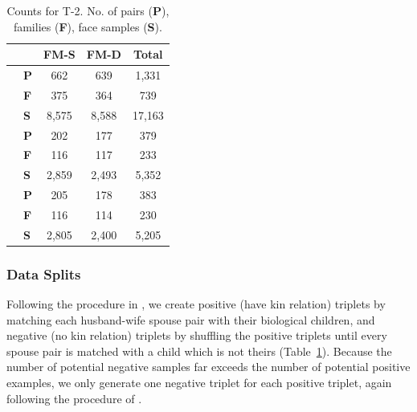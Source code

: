 \documentclass[letterpaper, 10 pt, conference]{ieeeconf}  %
\begin{document}
\begin{table}[b]
    \centering
    
    \caption{Counts for T-2. No. of pairs (\textbf{P}), families (\textbf{F}), face samples (\textbf{S}).}
    \small
    \begin{tabular}{p{.1in}m{.1in}ccc}
    & &FM-S &FM-D &Total\\\hline
     \parbox[t]{2mm}{
     }&\textbf{P} & 662  & 639 &1,331 \\
     &\textbf{F}  &375 & 364 & 739\\
     &\textbf{S} &8,575& 8,588 &  17,163\\\hline
    
    \parbox[t]{2mm}{
    } &\textbf{P}  & 202 & 177 & 379 \\
     &\textbf{F}  &116  & 117& 233\\
     &\textbf{S}  & 2,859 & 2,493 & 5,352 \\\hline
    \parbox[t]{2mm}{
    } &\textbf{P}  &  205& 178 & 383  \\
     &\textbf{F}  & 116  & 114  & 230 \\
     &\textbf{S}  & 2,805 &2,400 &5,205\\\hline
    
    \end{tabular}\label{tbl:track2:counts} 
\end{table}


\subsubsection{Data Splits}


Following the procedure in \cite{qin2015tri}, we create positive (have kin relation) triplets by matching each husband-wife spouse pair with their biological children, and negative (no kin relation) triplets by shuffling the positive triplets until every spouse pair is matched with a child which is not theirs (Table~\ref{tbl:track2:counts}).
Because the number of potential negative samples far exceeds the number of potential positive examples, we only generate one negative triplet for each positive triplet, again following the procedure of \cite{qin2015tri}. 
\end{document}
